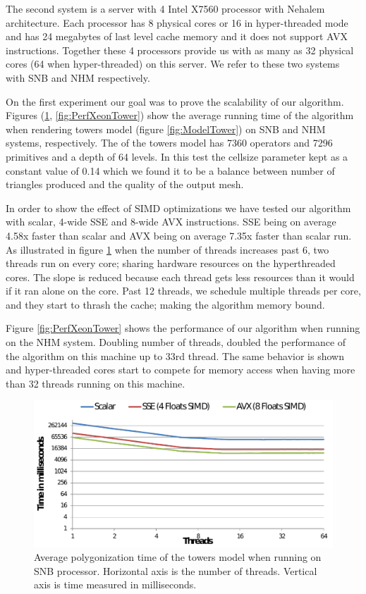 The second system is a server with 4 Intel X7560 processor with Nehalem architecture. Each processor has 8 physical cores
or 16 in hyper-threaded mode and has 24 megabytes of last level cache memory and it does not support AVX instructions. 
Together these 4 processors provide us with as many as 32 physical cores (64 when hyper-threaded) on this server. 
We refer to these two systems with SNB and NHM respectively.


On the first experiment our goal was to prove the scalability of our algorithm. Figures (\ref{fig:PerfSNBTower}, \ref{fig:PerfXeonTower}) 
show the average running time of the algorithm when rendering towers model (figure \ref{fig:ModelTower}) on SNB and NHM systems, 
respectively. The \blob of the towers model has 7360 operators and 7296 primitives and a depth of 64 levels. 
In this test the cellsize parameter kept as a constant value of 0.14 which we found it to be a balance between number of triangles produced and 
the quality of the output mesh.  

In order to show the effect of SIMD optimizations we have tested our algorithm with scalar, 4-wide SSE and 8-wide AVX instructions. 
SSE being on average 4.58x faster than scalar and AVX being on average 7.35x faster than scalar run. As illustrated in figure \ref{fig:PerfSNBTower}
when the number of threads increases past 6, two threads run on every core; sharing hardware resources on the hyperthreaded cores.  
The slope is reduced because each thread gets less resources than it would if it ran alone on the core.  Past 12 threads, we 
schedule multiple threads per core, and they start to thrash the cache; making the algorithm memory bound.

Figure \ref{fig:PerfXeonTower} shows the performance of our algorithm when running on the NHM system. Doubling number of 
threads, doubled the performance of the algorithm on this machine up to 33rd thread. The same behavior is shown and hyper-threaded 
cores start to compete for memory access when having more than 32 threads running on this machine.

\begin{figure}[H]
  \centering
  \includegraphics[width = 1.0\linewidth]{figures/cpupoly/Perf_SNB.pdf}
  \caption{\label{fig:PerfSNBTower}
  {Average polygonization time of the towers model when running on SNB processor. Horizontal axis is the number of threads. 
  Vertical axis is time measured in milliseconds.}
}
\end{figure}

